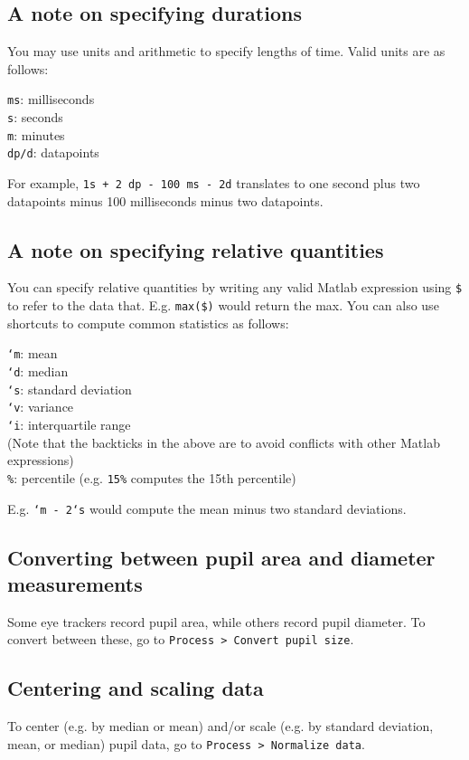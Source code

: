 \documentclass{article}
\begin{document}
\subsection{A note on specifying durations} \label{timestr_explanation}
You may use units and arithmetic to specify lengths of time. Valid units are as follows:
\begin{addmargin}[1em]{0em}
\texttt{ms}: milliseconds\\
\texttt{s}: seconds\\
\texttt{m}: minutes\\
\texttt{dp/d}: datapoints
\end{addmargin}
For example, \texttt{1s + 2 dp - 100 ms - 2d} translates to one second plus two datapoints minus 100 milliseconds minus two datapoints.
\subsection{A note on specifying relative quantities} \label{datastr_explanation}
You can specify relative quantities by writing any valid Matlab expression using \texttt{\$} to refer to the data that. E.g. \texttt{max(\$)} would return the max. You can also use shortcuts to compute common statistics as follows:
\begin{addmargin}[1em]{0em}
\texttt{`m}: mean\\
\texttt{`d}: median\\
\texttt{`s}: standard deviation\\
\texttt{`v}: variance\\
\texttt{`i}: interquartile range\\
(Note that the backticks in the above are to avoid conflicts with other Matlab expressions)\\
\texttt{\%}: percentile (e.g. \texttt{15\%} computes the 15th percentile)
\end{addmargin}
E.g. \texttt{`m - 2`s} would compute the mean minus two standard deviations.
\subsection{Converting between pupil area and diameter measurements}
Some eye trackers record pupil area, while others record pupil diameter. To convert between these, go to \texttt{Process > Convert pupil size}.
\subsection{Centering and scaling data}
To center (e.g. by median or mean) and/or scale (e.g. by standard deviation, mean, or median) pupil data, go to \texttt{Process > Normalize data}.
\end{document}
